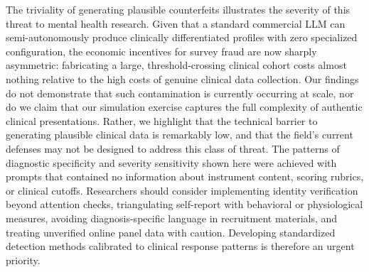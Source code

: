\documentclass[10pt]{article}
\begin{document}
The triviality of generating plausible counterfeits illustrates the severity of this threat to mental health research. Given that a standard commercial LLM can semi-autonomously produce clinically differentiated profiles with zero specialized configuration, the economic incentives for survey fraud are now sharply asymmetric: fabricating a large, threshold-crossing clinical cohort costs almost nothing relative to the high costs of genuine clinical data collection. Our findings do not demonstrate that such contamination is currently occurring at scale, nor do we claim that our simulation exercise captures the full complexity of authentic clinical presentations. Rather, we highlight that the technical barrier to generating plausible clinical data is remarkably low, and that the field's current defenses may not be designed to address this class of threat. The patterns of diagnostic specificity and severity sensitivity shown here were achieved with prompts that contained no information about instrument content, scoring rubrics, or clinical cutoffs. Researchers should consider implementing identity verification beyond attention checks, triangulating self-report with behavioral or physiological measures, avoiding diagnosis-specific language in recruitment materials, and treating unverified online panel data with caution\cite{quagan_navigating_2021}. Developing standardized detection methods calibrated to clinical response patterns is therefore an urgent priority.

\end{document}
